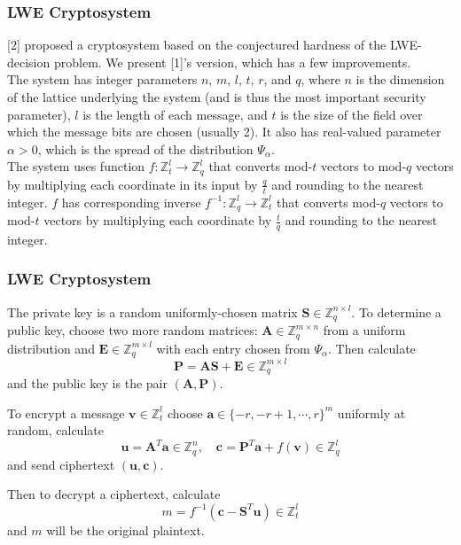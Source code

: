 \documentclass{beamer}
\renewcommand{\v}{\mathbf}
\begin{document}
\begin{frame}
\frametitle{LWE Cryptosystem}
[2] proposed a cryptosystem based on the conjectured hardness of the
LWE-decision problem. We present [1]'s version, which has a few
improvements.
\bigskip \\
The system has integer parameters $n$, $m$, $l$, $t$, $r$, and $q$, where $n$ is the dimension of the lattice underlying the system (and is thus
the most important security parameter), $l$ is the length of each message, and
$t$ is the size of the field over which the message bits are chosen (usually 2).
It also has real-valued parameter $\alpha > 0$, which is the spread of
the distribution $\Psi_{\alpha}$.
\bigskip \\
The system uses function $f: \mathbb{Z}_t^l \to \mathbb{Z}_q^l$ that converts
mod-$t$ vectors to mod-$q$ vectors by multiplying each coordinate in its
input by $\frac{q}{t}$ and rounding to the nearest integer.
$f$ has corresponding inverse $f^{-1}: \mathbb{Z}_q^l \to \mathbb{Z}_t^l$
that converts mod-$q$ vectors to mod-$t$ vectors by multiplying each
coordinate by $\frac{t}{q}$ and rounding to the nearest integer.
\end{frame}

\begin{frame}
\frametitle{LWE Cryptosystem}
The private key is a random uniformly-chosen matrix
$\v{S} \in \mathbb{Z}_q^{n \times l}$. 
To determine a public key, choose two more random matrices:
$\v{A} \in \mathbb{Z}_q^{m \times n}$ from a uniform distribution
and $\v{E} \in \mathbb{Z}_q^{m \times l}$ with each entry chosen
from $\Psi_{\alpha}$. Then calculate 
\begin{equation}
    \v{P} = \v{AS} + \v{E} \in \mathbb{Z}_q^{m \times l} 
\end{equation}
and the public key is the pair $(\v{A}, \v{P})$.

To encrypt a message $\v{v} \in \mathbb{Z}_t^l$ choose $\v{a} \in \{-r, -r+1, \cdots, r\}^m$ uniformly at random, calculate 
\begin{equation}
    \v{u} = \v{A}^T\v{a} \in \mathbb{Z}_q^n,\quad
    \v{c} = \v{P}^T\v{a} + f(\v{v}) \in \mathbb{Z}_q^l
\end{equation}
and send ciphertext $(\v{u}, \v{c})$.

Then to decrypt a ciphertext, calculate 
\begin{equation}
    m = f^{-1}(\v{c} - \v{S}^T\v{u}) \in \mathbb{Z}_t^l
\end{equation}
and $m$ will be the original plaintext.
\end{frame}
\end{document}
